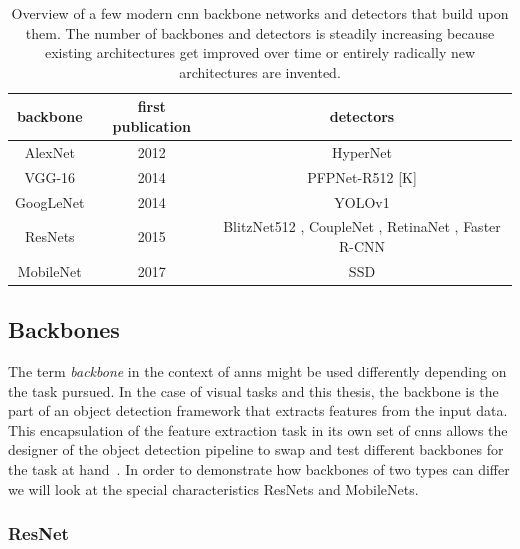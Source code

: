 \documentclass[
			   fontsize=11pt,
               paper=a4,
               bibliography=totoc,
               idxtotoc,
               headsepline,
               footsepline,
               footinclude=false,
               BCOR=12mm,
               DIV=13,
               openany,   %
               ]
               {scrbook}
\begin{document}
\begin{table}[H]
	\begin{tabularx}{\columnwidth}{C | C | C}
		\hline
		backbone					& first publication & detectors \\
		\hline \hline
		AlexNet						  & 2012 \cite{backboneAlexNet}			& HyperNet \cite{detectorHyperNet} \\
		\hline
		VGG-16						 & 2014 \cite{backboneVGG}			   & PFPNet-R512 [K] \\
		\hline
		GoogLeNet			   	   & 2014 \cite{backboneGoogLeNet}			 & YOLOv1 \cite{detectorYOLOv1} \\
		\hline
		ResNets					  	  & 2015 \cite{backboneResNet}		   & BlitzNet512 \cite{detectorBlitzNet}, CoupleNet \cite{detectorCoupleNet}, RetinaNet \cite{detectorRetinaNet},  Faster R-CNN \cite{ren2015faster} \\
		\hline
		MobileNet					 & 2017 \cite{backboneMobileNet}					 & SSD \cite{detectorSSD} \\		
	\end{tabularx}
	\caption[Modern CNN Backbones and Detectors]{Overview of a few modern \gls{cnn} backbone networks and detectors that build upon them. The number of backbones and detectors is steadily increasing because existing architectures get improved over time or entirely radically new architectures are invented.}
	\label{tab:backbonesDetectors}
\end{table}


\subsection{Backbones} \label{ssec:backbones}

The term \textit{backbone} in the context of \glspl{ann} might be used differently depending on the task pursued. In the case of visual tasks and this thesis, the backbone is the part of an object detection framework that extracts features from the input data. This encapsulation of the feature extraction task in its own set of \glspl{cnn} allows the designer of the object detection pipeline to swap and test different backbones for the task at hand~\cite{backbones}. In order to demonstrate how backbones of two types can differ we will look at the special characteristics ResNets and MobileNets.

\subsubsection{ResNet}
\end{document}
